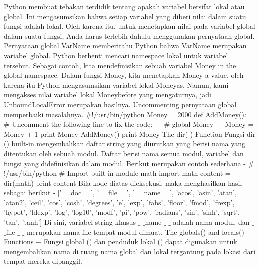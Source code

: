 Python membuat tebakan terdidik tentang apakah variabel bersifat lokal atau global. Ini mengasumsikan bahwa setiap variabel yang diberi nilai dalam suatu fungsi adalah lokal.
Oleh karena itu, untuk menetapkan nilai pada variabel global dalam suatu fungsi, Anda harus terlebih dahulu menggunakan pernyataan global. 
Pernyataan global VarName memberitahu Python bahwa VarName merupakan variabel global. Python berhenti mencari namespace lokal untuk variabel tersebut. 
Sebagai contoh, kita mendefinisikan sebuah variabel Money in the global namespace. Dalam fungsi Money, kita menetapkan Money a value, oleh karena itu Python mengasumsikan variabel lokal Moneyas. Namun, kami mengakses nilai variabel lokal Moneybefore yang mengaturnya, jadi UnboundLocalError merupakan hasilnya. Uncommenting pernyataan global memperbaiki masalahnya.
 \hspace*{0.5in}  $  \#  $!/usr/bin/python 
 \hspace*{0.5in} Money = 2000 
 \hspace*{0.5in} def AddMoney():
 \hspace*{0.5in} ~~  $  \#  $ Uncomment the following line to fix the code:
 \hspace*{0.5in} ~~  $  \#  $ global Money 
 \hspace*{0.5in} ~~ Money = Money + 1 
 \hspace*{0.5in} print Money 
 \hspace*{0.5in} AddMoney() 
 \hspace*{0.5in} print Money 
The dir( ) Function 
Fungsi dir () built-in mengembalikan daftar string yang diurutkan yang berisi nama yang ditentukan oleh sebuah modul.
Daftar berisi nama semua modul, variabel dan fungsi yang didefinisikan dalam modul. Berikut merupakan contoh sederhana - 
 \hspace*{0.5in}  $  \#  $!/usr/bin/python 
 \hspace*{0.5in}  $  \#  $ Import built-in module math
 \hspace*{0.5in} import math 
 \hspace*{0.5in} content = dir(math)
 \hspace*{0.5in} print content 
Bila kode diatas dieksekusi, maka menghasilkan hasil sebagai berikut - 
 \hspace*{0.5in} [' $  \_  $ $  \_  $doc $  \_  $ $  \_  $', ' $  \_  $ $  \_  $file $  \_  $ $  \_  $', ' $  \_  $ $  \_  $name $  \_  $ $  \_  $', 'acos', 'asin', 'atan',  
 \hspace*{0.5in} 'atan2', 'ceil', 'cos', 'cosh', 'degrees', 'e', 'exp',  
 \hspace*{0.5in} 'fabs', 'floor', 'fmod', 'frexp', 'hypot', 'ldexp', 'log', 
 \hspace*{0.5in} 'log10', 'modf', 'pi', 'pow', 'radians', 'sin', 'sinh', 
 \hspace*{0.5in} 'sqrt', 'tan', 'tanh'] 
Di sini, variabel string khusus  $  \_  $ $  \_  $name $  \_  $ $  \_  $ adalah nama modul, dan  $  \_  $ $  \_  $file $  \_  $ $  \_  $ merupakan nama file tempat modul dimuat.
The $  $globals() $  $and $  $locals() $  $Functions  $ - $
Fungsi global () dan penduduk lokal () dapat digunakan untuk mengembalikan nama di ruang nama global dan lokal tergantung pada lokasi dari tempat mereka dipanggil. 
 
